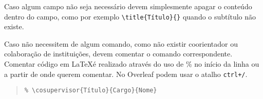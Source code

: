 Caso algum campo não seja necessário devem simplesmente apagar o conteúdo dentro do campo, como por exemplo \texttt{\textbackslash title\{Título\}\{\}} quando o subtítulo não existe.

Caso não necessitem de algum comando, como não existir coorientador ou colaboração de instituições, devem comentar o comando correspondente. Comentar código em \LaTeX é realizado através do uso de \% no início da linha ou a partir de onde querem comentar. No Overleaf podem usar o atalho \texttt{ctrl+/}.
\begin{quote}
    \texttt{\% \textbackslash cosupervisor\{Título\}\{Cargo\}\{Nome\}}
\end{quote}